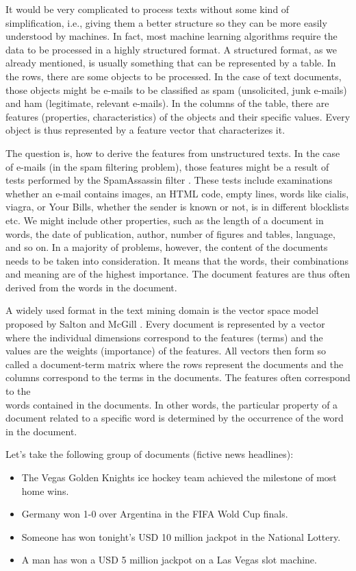 \documentclass[11pt,openany,executivepaper]{book}
\begin{document}
It would be very complicated to process texts without some kind of simplification, i.e., giving them a better structure so they can be more easily understood by machines. In fact, most machine learning algorithms require the data to be processed in a highly structured format. A structured format, as we already mentioned, is usually something that can be represented by a table. In the rows, there are some objects to be processed. In the case of text documents, those objects might be e-mails to be classified as spam (unsolicited, junk e-mails) and ham (legitimate, relevant e-mails). In the columns of the table, there are features (properties, characteristics) of the objects and their specific values. Every object is thus represented by a feature vector that characterizes it.

The question is, how to derive the features from unstructured texts. In the case of e-mails (in the spam filtering problem), those features might be a result of tests performed by the SpamAssassin filter \cite{89}. These tests include examinations whether an e-mail contains images, an HTML code, empty lines, words like cialis, viagra, or Your Bills, whether the sender is known or not, is in different blocklists etc. We might include other properties, such as the length of a document in words, the date of publication, author, number of figures and tables, language, and so on. In a majority of problems, however, the content of the documents needs to be taken into consideration. It means that the words, their combinations and meaning are of the highest importance. The document features are thus often derived from the words in the document.

A widely used format in the text mining domain is the vector space model proposed by Salton and McGill \cite{236}. Every document is represented by a vector where the individual dimensions correspond to the features (terms) and the values are the weights (importance) of the features. All vectors then form so called a document-term matrix where the rows represent the documents and the columns correspond to the terms in the documents. The features often correspond to the\\
words contained in the documents. In other words, the particular property of a document related to a specific word is determined by the occurrence of the word in the document.

Let's take the following group of documents (fictive news headlines):

\begin{itemize}
  \itshape
  \item The Vegas Golden Knights ice hockey team achieved the milestone of most home wins.
  \item Germany won 1-0 over Argentina in the FIFA Wold Cup finals.
  \item Someone has won tonight's USD 10 million jackpot in the National Lottery.
  \item A man has won a USD 5 million jackpot on a Las Vegas slot machine.
\end{itemize}
\end{document}
